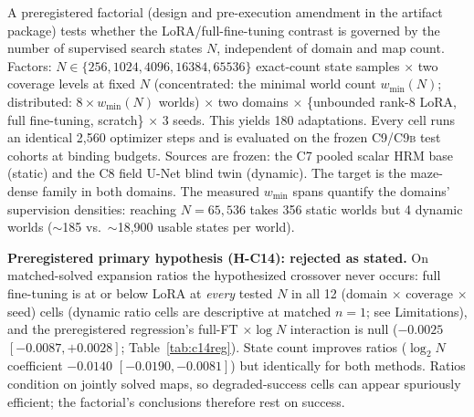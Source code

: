 \documentclass[letterpaper]{article} %
\newcommand{\stage}[1]{\textsc{#1}}
\begin{document}
A preregistered factorial (design and pre-execution amendment in the artifact package) tests whether the LoRA/full-fine-tuning contrast is governed by the number of supervised search states $N$, independent of domain and map count. Factors: $N \in \{256, 1024, 4096, 16384, 65536\}$ exact-count state samples $\times$ two coverage levels at fixed $N$ (concentrated: the minimal world count $w_{\min}(N)$; distributed: $8 \times w_{\min}(N)$ worlds) $\times$ two domains $\times$ \{unbounded rank-8 LoRA, full fine-tuning, scratch\} $\times$ 3 seeds. This yields 180 adaptations. Every cell runs an identical 2{,}560 optimizer steps and is evaluated on the frozen \stage{C9}/\stage{C9b} test cohorts at binding budgets. Sources are frozen: the \stage{C7} pooled scalar HRM base (static) and the \stage{C8} field U-Net blind twin (dynamic). The target is the maze-dense family in both domains. The measured $w_{\min}$ spans quantify the domains' supervision densities: reaching $N{=}65{,}536$ takes 356 static worlds but 4 dynamic worlds ($\sim$185 vs.\ $\sim$18{,}900 usable states per world).

\textbf{Preregistered primary hypothesis (H-C14): rejected as stated.} On matched-solved expansion ratios the hypothesized crossover never occurs: full fine-tuning is at or below LoRA at \emph{every} tested $N$ in all 12 (domain $\times$ coverage $\times$ seed) cells (dynamic ratio cells are descriptive at matched $n{=}1$; see Limitations), and the preregistered regression's full-FT $\times \log N$ interaction is null ($-0.0025$ $[-0.0087, +0.0028]$; Table~\ref{tab:c14reg}). State count improves ratios ($\log_2 N$ coefficient $-0.0140$ $[-0.0190, -0.0081]$) but identically for both methods. Ratios condition on jointly solved maps, so degraded-success cells can appear spuriously efficient; the factorial's conclusions therefore rest on success.
\end{document}
